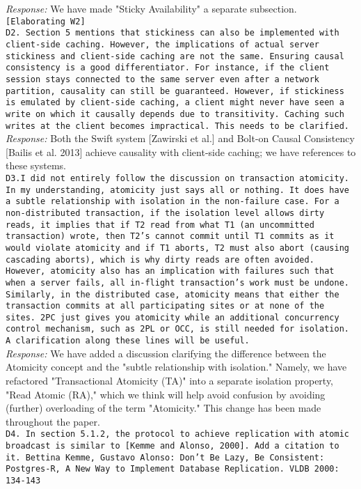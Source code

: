 \documentclass[10pt]{article}
\newcommand{\reviewer}[1] {\noindent\texttt{#1}\\}
\newcommand{\response}[1] {\noindent\textit{Response: } #1\\}
\begin{document}
\response{We have made "Sticky Availability" a separate subsection.}

\reviewer{[Elaborating W2]\\
D2. Section 5 mentions that stickiness can also be implemented with client-side caching. However, the implications of actual server stickiness and client-side caching are not the same. Ensuring causal consistency is a good differentiator. For instance, if the client session stays connected to the same server even after a network partition, causality can still be guaranteed. However, if stickiness is emulated by client-side caching, a client might never have seen a write on which it causally depends due to transitivity. Caching such writes at the client becomes impractical. This needs to be clarified.}

\response{Both the Swift system [Zawirski et al.] and Bolt-on Causal Consistency
[Bailis et al. 2013] achieve causality with client-side caching; we
have references to these systems.}

\reviewer{D3.I did not entirely follow the discussion on transaction atomicity. In my understanding, atomicity just says all or nothing. It does have a subtle relationship with isolation in the non-failure case. For a non-distributed transaction, if the isolation level allows dirty reads, it implies that if T2 read from what T1 (an uncommitted transaction) wrote, then T2's cannot commit until T1 commits as it would violate atomicity and if T1 aborts, T2 must also abort (causing cascading aborts), which is why dirty reads are often avoided. However, atomicity also has an implication with failures such that when a server fails, all in-flight transaction's work must be undone. Similarly, in the distributed case, atomicity means that either the transaction commits at all participating sites or at none of the sites. 2PC just gives you atomicity while an additional concurrency control mechanism, such as 2PL or OCC, is still needed for isolation. A clarification along these lines will be useful.}

\response{We have added a discussion clarifying the difference between the
Atomicity concept and the "subtle relationship with isolation."
Namely, we have refactored "Transactional Atomicity (TA)" into a
separate isolation property, "Read Atomic (RA)," which we think will
help avoid confusion by avoiding (further) overloading of the term
"Atomicity." This change has been made throughout the paper.}

\reviewer{D4. In section 5.1.2, the protocol to achieve replication with atomic broadcast is similar to [Kemme and Alonso, 2000]. Add a citation to it. Bettina Kemme, Gustavo Alonso: Don't Be Lazy, Be Consistent: Postgres-R, A New Way to Implement Database Replication. VLDB 2000: 134-143}
\end{document}
